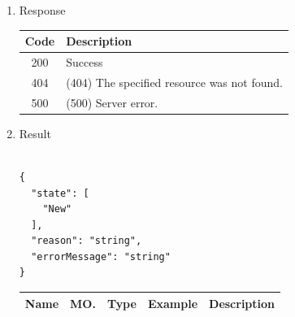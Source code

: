\begin{enumerate}
\begin{enumerate}
\begin{table}[H]
\begin{center}
\begin{tabular}{|p{3cm}|l|p{3cm}|p{3cm}|p{4cm}|}
\end{tabular}
\end{center}
\end{table}


\item REST Method

\begin{tcolorbox}[boxrule=0pt, frame empty]
\begin{verbatim} 

GET /activity/{activityId}/state

\end{verbatim}
\end{tcolorbox}

\end{enumerate}

\item Response

\begin{table}[H]
\footnotesize

\begin{center}
\begin{tabular}{|c|l|} 
\hline
\rowcolor{lightgray}	Code 		& 	Description \\
\hline
200	 		&	Success \\
\hline
404			&	(404) The specified resource was not found. \\
\hline
500			&	(500) Server error. \\
\hline
\end{tabular}
\end{center}
\end{table}

\item Result

\begin{tcolorbox}[boxrule=0pt, frame empty]
\begin{verbatim}

{
  "state": [
    "New"
  ],
  "reason": "string",
  "errorMessage": "string"
}

\end{verbatim}
\end{tcolorbox}

\begin{table}[H]
\footnotesize
\begin{center}
\begin{tabular}{|p{3cm}|l|p{3cm}|p{3cm}|p{4cm}|} 
\hline
\rowcolor{lightgray}	Name	& MO.	& Type	& Example & 	Description \\
\hline


\end{tabular}
\end{center}
\end{table}
\end{enumerate}
